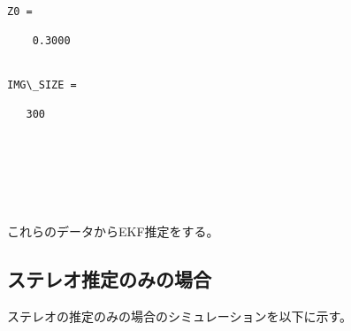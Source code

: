 \documentclass[10pt,dvipdfmx,fleqn]{jarticle}
\begin{document}
    \begin{Verbatim}[commandchars=\\\{\}]

Z0 =

    0.3000


IMG\_SIZE =

   300



    \end{Verbatim}

    \begin{center}
    \end{center}
    { \hspace*{\fill} \\}
    
    \begin{center}
    \end{center}
    { \hspace*{\fill} \\}
    
    これらのデータからEKF推定をする。

\subsection{ステレオ推定のみの場合}\label{ux30b9ux30c6ux30ecux30aaux63a8ux5b9aux306eux307fux306eux5834ux5408}

ステレオの推定のみの場合のシミュレーションを以下に示す。
\end{document}
